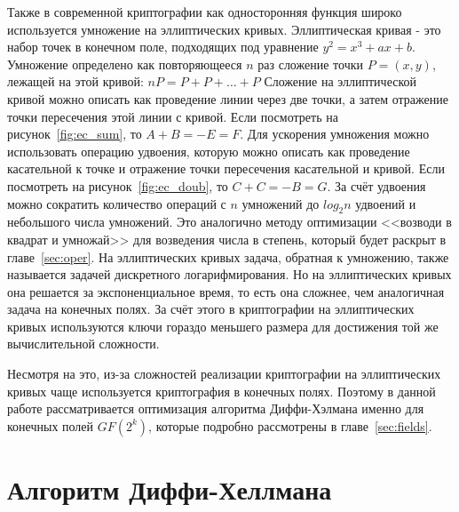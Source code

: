 \documentclass[times,specification,annotation]{itmo-student-thesis}
\begin{document}
Также в современной криптографии как односторонняя функция широко используется умножение на эллиптических кривых.
Эллиптическая кривая - это набор точек в конечном поле, подходящих под уравнение $y^2=x^3+ax+b$.
Умножение определено как повторяющееся $n$ раз сложение точки $P=(x,y)$, лежащей на этой кривой: $nP=P+P+\dots+P$
Сложение на эллиптической кривой можно описать как проведение линии через две точки, а затем отражение точки пересечения этой линии с кривой.
Если посмотреть на рисунок~\ref{fig:ec_sum}, то $A+B=-E=F$.
Для ускорения умножения можно использовать операцию удвоения, которую можно описать как проведение касательной к точке и
отражение точки пересечения касательной и кривой.
Если посмотреть на рисунок~\ref{fig:ec_doub}, то $C+C=-B=G$.
За счёт удвоения можно сократить количество операций с $n$ умножений до $log_2 n$ удвоений и небольшого числа умножений.
Это аналогично методу оптимизации <<возводи в квадрат и умножай>> для возведения числа в степень, который будет раскрыт в главе~\ref{sec:oper}.
На эллиптических кривых задача, обратная к умножению, также называется задачей дискретного логарифмирования.
Но на эллиптических кривых она решается за экспоненциальное время, то есть она сложнее, чем аналогичная задача на конечных полях.
За счёт этого в криптографии на эллиптических кривых используются ключи гораздо меньшего размера для достижения той же вычислительной сложности.\par
Несмотря на это, из-за сложностей реализации криптографии на эллиптических кривых чаще используется криптография в конечных полях.
Поэтому в данной работе рассматривается оптимизация алгоритма Диффи-Хэлмана именно для конечных полей $GF(2^k)$, которые подробно рассмотрены в главе~\ref{sec:fields}.


\section{Алгоритм Диффи-Хеллмана}\label{sec:dhke}
\end{document}
